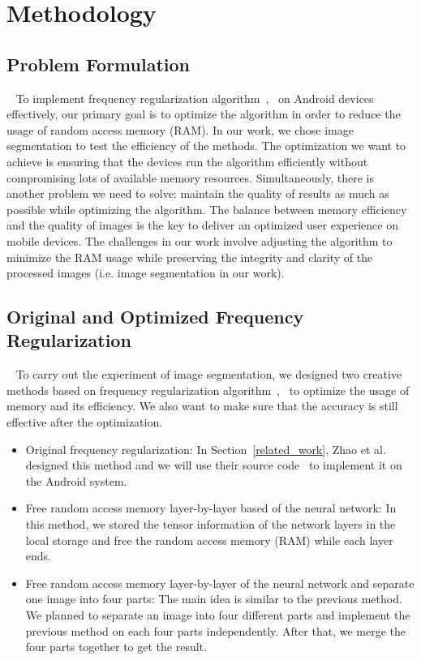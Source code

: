 \documentclass[runningheads]{llncs}
\begin{document}
\section{Methodology}\label{methodology}
\subsection{Problem Formulation}~\label{formulation}
To implement frequency regularization algorithm~\cite{zhao2023fr},~\cite{fr_repo} on Android devices effectively, our primary goal is to optimize the algorithm in order to reduce the usage of random access memory (RAM). In our work, we chose image segmentation to test the efficiency of the methods. The optimization we want to achieve is ensuring that the devices run the algorithm efficiently without compromising lots of available memory resources. Simultaneously, there is another problem we need to solve: maintain the quality of results as much as possible while optimizing the algorithm. The balance between memory efficiency and the quality of images is the key to deliver an optimized user experience on mobile devices. The challenges in our work involve adjusting the algorithm to minimize the RAM usage while preserving the integrity and clarity of the processed images (i.e. image segmentation in our work).


\subsection{Original and Optimized Frequency Regularization}~\label{optimized}
To carry out the experiment of image segmentation, we designed two creative methods based on frequency regularization algorithm~\cite{zhao2023fr},~\cite{fr_repo}  to optimize the usage of memory and its efficiency. We also want to make sure that the accuracy is still effective after the optimization.
\begin{itemize}
	\item Original frequency regularization: In Section~\ref{related_work}, Zhao et al. designed this method and we will use their source code~\cite{fr_repo} to implement it on the Android system.
	\item Free random access memory layer-by-layer based of the neural network: In this method, we stored the tensor information of the network layers in the local storage and free the random access memory (RAM) while each layer ends. 
	\item Free random access memory layer-by-layer of the neural network and separate one image into four parts: The main idea is similar to the previous method. We planned to separate an image into four different parts and implement the previous method on each four parts independently. After that, we merge the four parts together to get the result. 
\end{itemize}	 		
\end{document}
